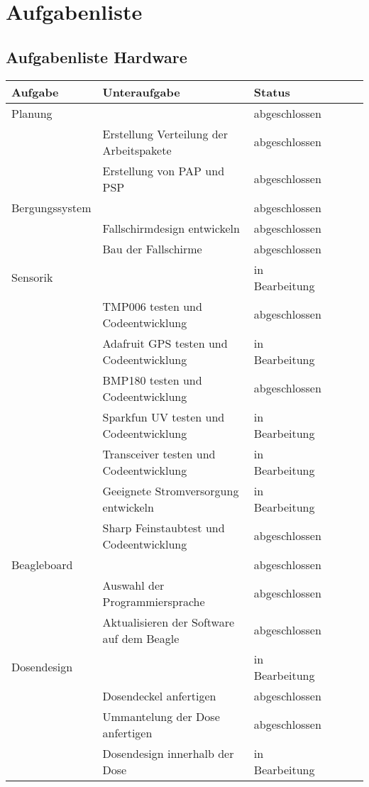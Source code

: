 \section{Aufgabenliste}

\subsection{Aufgabenliste Hardware}
\begin{table}[H]
  \centering
    \begin{tabular}{p{3cm}p{7cm}p{3cm}rrr}
    \toprule
    \textbf{Aufgabe} & \textbf{Unteraufgabe} & \textbf{Status} \\
    \midrule
  	Planung & & abgeschlossen \\
	& Erstellung Verteilung der Arbeitspakete & abgeschlossen \\
	& Erstellung von PAP und PSP & abgeschlossen \\
	\midrule
	Bergungssystem & & abgeschlossen \\
	& Fallschirmdesign entwickeln & abgeschlossen\\
	& Bau der Fallschirme & abgeschlossen\\
	\midrule
	Sensorik & & in Bearbeitung\\
	& TMP006 testen und Codeentwicklung & abgeschlossen\\
	& Adafruit GPS testen und Codeentwicklung & in Bearbeitung\\
	& BMP180 testen und Codeentwicklung & abgeschlossen\\
	& Sparkfun UV testen und Codeentwicklung & in Bearbeitung\\
	& Transceiver testen und Codeentwicklung & in Bearbeitung\\
	& Geeignete Stromversorgung entwickeln & in Bearbeitung\\
	& Sharp Feinstaubtest und Codeentwicklung & abgeschlossen\\
	\midrule
	Beagleboard & & abgeschlossen\\
	& Auswahl der Programmiersprache & abgeschlossen\\
	& Aktualisieren der Software auf dem Beagle & abgeschlossen\\
	\midrule
	Dosendesign & & in Bearbeitung\\
	& Dosendeckel anfertigen & abgeschlossen\\
	& Ummantelung der Dose anfertigen & abgeschlossen\\
	& Dosendesign innerhalb der Dose & in Bearbeitung\\

\end{tabular}
\end{table}
